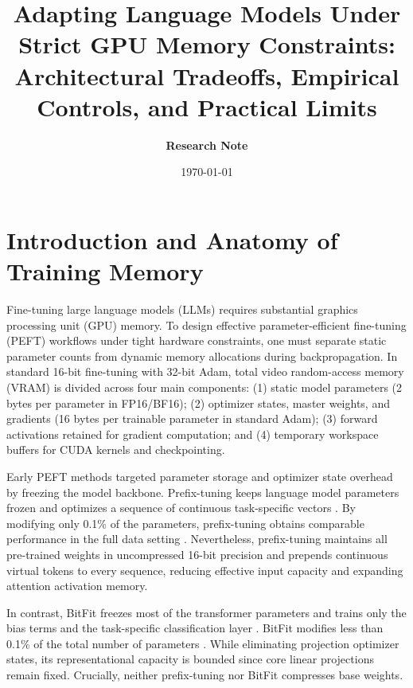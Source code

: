 \documentclass[11pt,a4paper]{article}
\title{\textbf{Adapting Language Models Under Strict GPU Memory Constraints:\\Architectural Tradeoffs, Empirical Controls, and Practical Limits}}
\author{\textbf{Research Note}}
\date{\today}
\begin{document}
\maketitle

\section{Introduction and Anatomy of Training Memory}
Fine-tuning large language models (LLMs) requires substantial graphics processing unit (GPU) memory. To design effective parameter-efficient fine-tuning (PEFT) workflows under tight hardware constraints, one must separate static parameter counts from dynamic memory allocations during backpropagation. In standard 16-bit fine-tuning with 32-bit Adam, total video random-access memory (VRAM) is divided across four main components: (1) static model parameters (2 bytes per parameter in FP16/BF16); (2) optimizer states, master weights, and gradients (16 bytes per trainable parameter in standard Adam); (3) forward activations retained for gradient computation; and (4) temporary workspace buffers for CUDA kernels and checkpointing.

Early PEFT methods targeted parameter storage and optimizer state overhead by freezing the model backbone. Prefix-tuning keeps language model parameters frozen and optimizes a sequence of continuous task-specific vectors \cite{li2021prefix}. By modifying only 0.1\% of the parameters, prefix-tuning obtains comparable performance in the full data setting \cite{li2021prefix}. Nevertheless, prefix-tuning maintains all pre-trained weights in uncompressed 16-bit precision and prepends continuous virtual tokens to every sequence, reducing effective input capacity and expanding attention activation memory.

In contrast, BitFit freezes most of the transformer parameters and trains only the bias terms and the task-specific classification layer \cite{zaken2022bitfit}. BitFit modifies less than 0.1\% of the total number of parameters \cite{zaken2022bitfit}. While eliminating projection optimizer states, its representational capacity is bounded since core linear projections remain fixed. Crucially, neither prefix-tuning nor BitFit compresses base weights.
\end{document}

